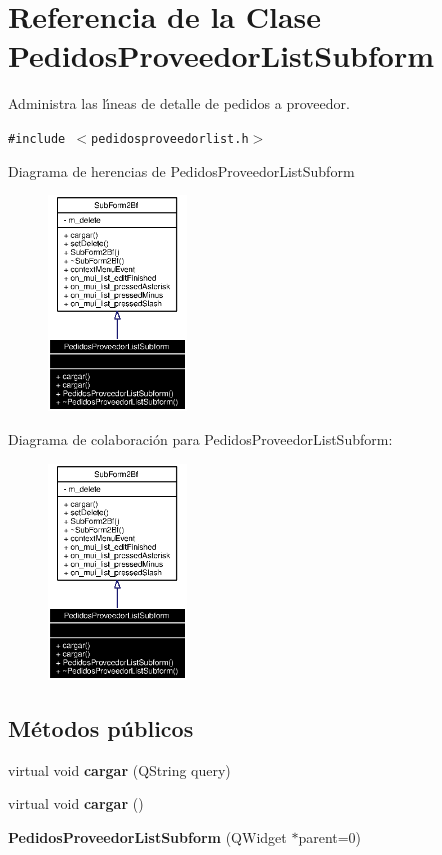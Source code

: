 \section{Referencia de la Clase Pedidos\-Proveedor\-List\-Subform}
\label{classPedidosProveedorListSubform}
Administra las l\'{\i}neas de detalle de pedidos a proveedor.  


{\tt \#include $<$pedidosproveedorlist.h$>$}

Diagrama de herencias de Pedidos\-Proveedor\-List\-Subform\begin{figure}[H]
\begin{center}
\leavevmode
\includegraphics[width=104pt]{classPedidosProveedorListSubform__inherit__graph}
\end{center}
\end{figure}
Diagrama de colaboraci\'{o}n para Pedidos\-Proveedor\-List\-Subform:\begin{figure}[H]
\begin{center}
\leavevmode
\includegraphics[width=104pt]{classPedidosProveedorListSubform__coll__graph}
\end{center}
\end{figure}
\subsection*{M\'{e}todos p\'{u}blicos}
\begin{CompactItemize}
\item 
virtual void {\bf cargar} (QString query)\label{classPedidosProveedorListSubform_a0}

\item 
virtual void {\bf cargar} ()\label{classPedidosProveedorListSubform_a1}

\item 
{\bf Pedidos\-Proveedor\-List\-Subform} (QWidget $\ast$parent=0)
\end{CompactItemize}


